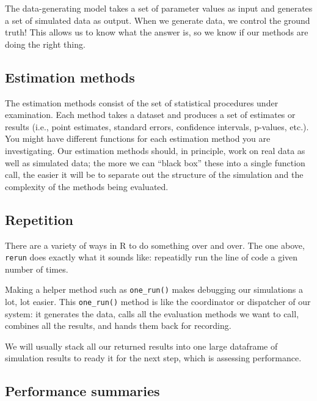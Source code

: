 \documentclass[
]{book}
\begin{document}
The data-generating model takes a set of parameter values as input and generates a set of simulated data as output.
When we generate data, we control the ground truth!
This allows us to know what the answer is, so we know if our methods are doing the right thing.

\hypertarget{estimation-methods}{%
\subsection{Estimation methods}\label{estimation-methods}}

The estimation methods consist of the set of statistical procedures under examination.
Each method takes a dataset and produces a set of estimates or results (i.e., point estimates, standard errors, confidence intervals, p-values, etc.).
You might have different functions for each estimation method you are investigating.
Our estimation methods should, in principle, work on real data as well as simulated data; the more we can ``black box'' these into a single function call, the easier it will be to separate out the structure of the simulation and the complexity of the methods being evaluated.

\hypertarget{repetition}{%
\subsection{Repetition}\label{repetition}}

There are a variety of ways in R to do something over and over.
The one above, \texttt{rerun} does exactly what it sounds like: repeatidly run the line of code a given number of times.

Making a helper method such as \texttt{one\_run()} makes debugging our simulations a lot, lot easier.
This \texttt{one\_run()} method is like the coordinator or dispatcher of our system: it generates the data, calls all the evaluation methods we want to call, combines all the results, and hands them back for recording.

We will usually stack all our returned results into one large dataframe of simulation results to ready it for the next step, which is assessing performance.

\hypertarget{performance-summaries}{%
\subsection{Performance summaries}\label{performance-summaries}}
\end{document}
